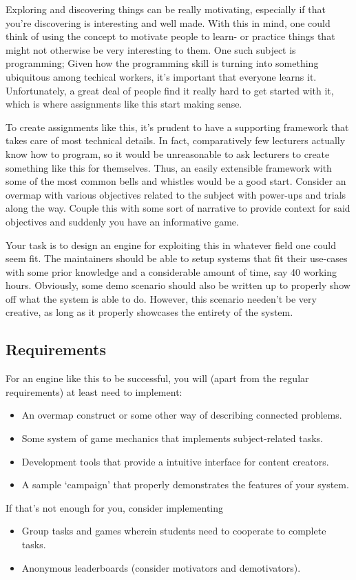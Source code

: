 Exploring and discovering things can be really motivating, especially if that you're discovering is interesting and well made. With this in mind, one could think of using the concept to motivate people to learn- or practice things that might not otherwise be very interesting to them. One such subject is programming; Given how the programming skill is turning into something ubiquitous among techical workers, it's important that everyone learns it. Unfortunately, a great deal of people find it really hard to get started with it, which is where assignments like this start making sense.

To create assignments like this, it's prudent to have a supporting framework that takes care of most technical details. In fact, comparatively few lecturers actually know how to program, so it would be unreasonable to ask lecturers to create something like this for themselves. Thus, an easily extensible framework with some of the most common bells and whistles would be a good start. Consider an overmap with various objectives related to the subject with power-ups and trials along the way. Couple this with some sort of narrative to provide context for said objectives and suddenly you have an informative game.

Your task is to design an engine for exploiting this in whatever field one could seem fit. The maintainers should be able to setup systems that fit their use-cases with some prior knowledge and a considerable amount of time, say 40 working hours. Obviously, some demo scenario should also be written up to properly show off what the system is able to do. However, this scenario needen't be very creative, as long as it properly showcases the entirety of the system.

\subsection{Requirements}
For an engine like this to be successful, you will (apart from the regular requirements) at least need to implement:
\begin{itemize}
    \item An overmap construct or some other way of describing connected problems.
    \item Some system of game mechanics that implements subject-related tasks.
    \item Development tools that provide a intuitive interface for content creators.
    \item A sample `campaign' that properly demonstrates the features of your system.
\end{itemize}
If that's not enough for you, consider implementing
\begin{itemize}
    \item Group tasks and games wherein students need to cooperate to complete tasks.
    \item Anonymous leaderboards (consider motivators and demotivators).
\end{itemize}
